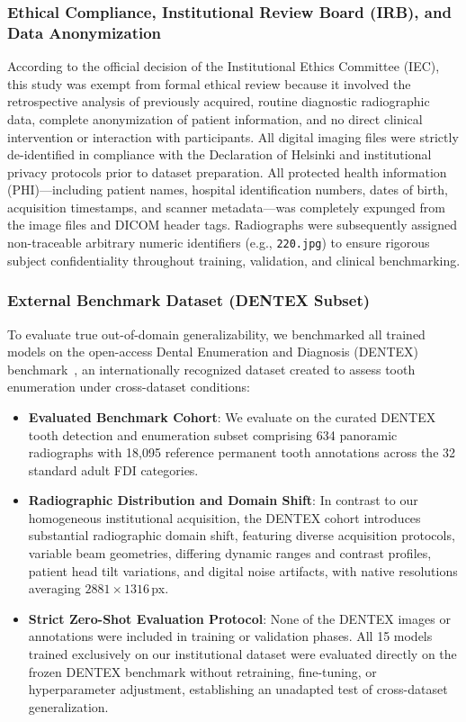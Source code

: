 \documentclass[10pt,journal,compsoc]{IEEEtran}
\begin{document}
\subsubsection{Ethical Compliance, Institutional Review Board (IRB), and Data Anonymization}
According to the official decision of the Institutional Ethics Committee (IEC), this study was exempt from formal ethical review because it involved the retrospective analysis of previously acquired, routine diagnostic radiographic data, complete anonymization of patient information, and no direct clinical intervention or interaction with participants. All digital imaging files were strictly de-identified in compliance with the Declaration of Helsinki and institutional privacy protocols prior to dataset preparation. All protected health information (PHI)—including patient names, hospital identification numbers, dates of birth, acquisition timestamps, and scanner metadata—was completely expunged from the image files and DICOM header tags. Radiographs were subsequently assigned non-traceable arbitrary numeric identifiers (e.g., \texttt{220.jpg}) to ensure rigorous subject confidentiality throughout training, validation, and clinical benchmarking.

\subsubsection{External Benchmark Dataset (DENTEX Subset)}
To evaluate true out-of-domain generalizability, we benchmarked all trained models on the open-access Dental Enumeration and Diagnosis (DENTEX) benchmark~\cite{dentex2023}, an internationally recognized dataset created to assess tooth enumeration under cross-dataset conditions:
\begin{itemize}
    \item \textbf{Evaluated Benchmark Cohort}: We evaluate on the curated DENTEX tooth detection and enumeration subset comprising 634 panoramic radiographs with 18,095 reference permanent tooth annotations across the 32 standard adult FDI categories.
    \item \textbf{Radiographic Distribution and Domain Shift}: In contrast to our homogeneous institutional acquisition, the DENTEX cohort introduces substantial radiographic domain shift, featuring diverse acquisition protocols, variable beam geometries, differing dynamic ranges and contrast profiles, patient head tilt variations, and digital noise artifacts, with native resolutions averaging $2881 \times 1316$\,px.
    \item \textbf{Strict Zero-Shot Evaluation Protocol}: None of the DENTEX images or annotations were included in training or validation phases. All 15 models trained exclusively on our institutional dataset were evaluated directly on the frozen DENTEX benchmark without retraining, fine-tuning, or hyperparameter adjustment, establishing an unadapted test of cross-dataset generalization.
\end{itemize}
\end{document}
